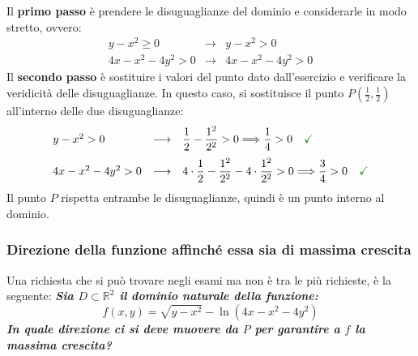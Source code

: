 \documentclass[a4paper]{article}
\begin{document}
	\noindent
	Il \textbf{primo passo} è prendere le disuguaglianze del dominio e considerarle in modo stretto, ovvero:
	\begin{equation*}
		\begin{array}{lcl}
			y-x^{2} \ge 0			& \longrightarrow & y-x^{2} > 0 \\
			4x - x^{2} - 4y^{2} > 0	& \longrightarrow & 4x - x^{2} - 4y^{2} > 0
		\end{array}
	\end{equation*}
	Il \textbf{secondo passo} è sostituire i valori del punto dato dall'esercizio e verificare la veridicità delle disuguaglianze. In questo caso, si sostituisce il punto $P\left(\frac{1}{2}, \frac{1}{2}\right)$ all'interno delle due disuguaglianze:
	\begin{equation*}
		\begin{array}{lcl}
			y -x^{2} > 0			& \longrightarrow & \dfrac{1}{2} - \dfrac{1^{2}}{2^{2}} > 0 \Longrightarrow \dfrac{1}{4} > 0 \hspace{1em} \textcolor{Green4}{\checkmark} \\ [1em]
			4x - x^{2} - 4y^{2} > 0	& \longrightarrow & 4 \cdot \dfrac{1}{2} - \dfrac{1^{2}}{2^{2}} - 4 \cdot \dfrac{1^{2}}{2^{2}} > 0 \Longrightarrow \dfrac{3}{4} > 0 \hspace{1em} \textcolor{Green4}{\checkmark}
		\end{array}
	\end{equation*}
	Il punto $P$ rispetta entrambe le disuguaglianze, quindi è un punto interno al dominio.\newpage

	\subsubsection{Direzione della funzione affinché essa sia di massima crescita}\label{par: direzione della funzione affinché essa sia di massima crescita}

	Una richiesta che si può trovare negli esami ma non è tra le più richieste, è la seguente: \textcolor{Green4}{\textbf{\emph{Sia $D\subset\mathbb{R}^{2}$ il dominio naturale della funzione:}}
	\begin{equation*}
		f\left(x,y\right) = \sqrt{y-x^{2}}-\ln\left(4x-x^{2}-4y^{2}\right)
	\end{equation*}
	\textbf{\emph{In quale direzione ci si deve muovere da $P$ per garantire a $f$ la massima crescita?}}}\newline
\end{document}
